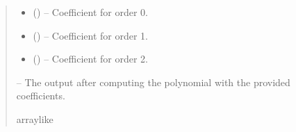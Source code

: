 \documentclass[letterpaper,11pt,english]{sphinxmanual}
\begin{document}
\begin{savenotes}
\begin{fulllineitems}
\begin{savenotes}
\begin{fulllineitems}
\begin{quote}
\begin{description}
\begin{itemize}
\item {} 
\sphinxAtStartPar
{} () – Coefficient for order 0.

\item {} 
\sphinxAtStartPar
{} () – Coefficient for order 1.

\item {} 
\sphinxAtStartPar
{} () – Coefficient for order 2.

\end{itemize}

\sphinxAtStartPar
{} – The output after computing the polynomial with the provided
coefficients.

\sphinxAtStartPar
array\sphinxhyphen{}like

\end{description}\end{quote}

\end{fulllineitems}\end{savenotes}



\end{fulllineitems}
\end{savenotes}
\end{document}
